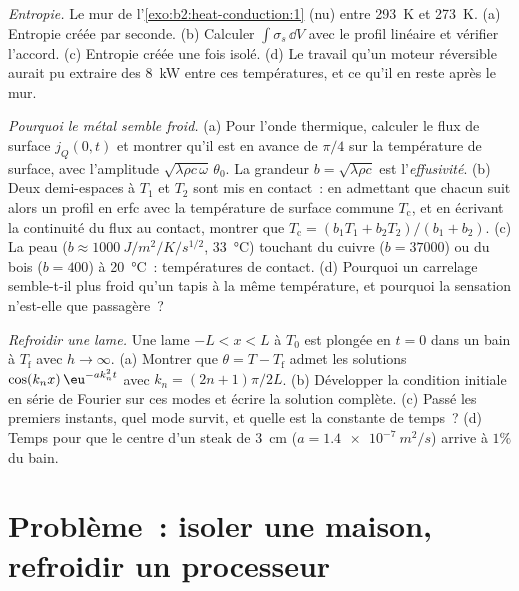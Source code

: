 \begin{exercise}[$\star\star\star$]\label{exo:b2:heat-conduction:10}
\emph{Entropie.} Le mur de l'\cref{exo:b2:heat-conduction:1} (nu)
entre \qty{293}{K} et \qty{273}{K}. (a) Entropie créée par seconde.
(b) Calculer $\int\sigma_s\,\dd V$ avec le profil linéaire et vérifier
l'accord. (c) Entropie créée une fois isolé. (d) Le travail qu'un
moteur réversible aurait pu extraire des \qty{8}{kW} entre
ces températures, et ce qu'il en reste après le mur.
\end{exercise}

\begin{exercise}[$\star\star\star$]\label{exo:b2:heat-conduction:11}
\emph{Pourquoi le métal semble froid.} (a) Pour l'onde thermique, calculer le
flux de surface $j_Q(0,t)$ et montrer qu'il est en avance de $\pi/4$ sur la température
de surface, avec l'amplitude $\sqrt{\lambda\rho c\,\omega}\,\theta_0$. La
grandeur $b = \sqrt{\lambda\rho c}$ est l'\emph{effusivité}. (b) Deux
demi-espaces à $T_1$ et $T_2$ sont mis en contact~: en admettant que
chacun suit alors un profil en erfc avec la température de surface commune
$T_{\text{c}}$, et en écrivant la continuité du flux au contact,
montrer que $T_{\text{c}} = (b_1T_1 + b_2T_2)/(b_1 + b_2)$. (c) La peau
($b \approx \qty{1000}{J/m^2/K/s^{1/2}}$, \qty{33}{\celsius}) touchant du
cuivre ($b = 37000$) ou du bois ($b = 400$) à \qty{20}{\celsius}~: températures
de contact. (d) Pourquoi un carrelage semble-t-il plus froid qu'un tapis à
la même température, et pourquoi la sensation n'est-elle que passagère~?
\end{exercise}

\begin{exercise}[$\star\star\star$]\label{exo:b2:heat-conduction:12}
\emph{Refroidir une lame.} Une lame $-L < x < L$ à $T_0$ est plongée en $t =
0$ dans un bain à $T_{\text{f}}$ avec $h \to \infty$. (a) Montrer que $\theta =
T - T_{\text{f}}$ admet les solutions $\cos(k_nx)\,\eu^{-ak_n^2t}$ avec $k_n
= (2n+1)\pi/2L$. (b) Développer la condition initiale en série de Fourier
sur ces modes et écrire la solution complète. (c) Passé les premiers
instants, quel mode survit, et quelle est la constante de temps~? (d) Temps
pour que le centre d'un steak de \qty{3}{cm} ($a = \qty{1.4e-7}{m^2/s}$) arrive
à $1\%$ du bain.
\end{exercise}

\section{Problème~: isoler une maison, refroidir un processeur}

